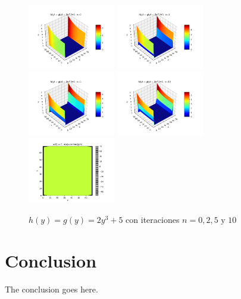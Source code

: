 \documentclass[10pt,journal,compsoc]{IEEEtran}
\begin{document}
\begin{figure}
  \centering
  \includegraphics[width=1.5in]{images/2y3-n0}
  \includegraphics[width=1.5in]{images/2y3-n2}
  \includegraphics[width=1.5in]{images/2y3-n5}
  \includegraphics[width=1.5in]{images/2y3-n10}
  \includegraphics[width=1.5in]{images/2y3-density}
  \caption{\(h(y) = g(y) = 2y^3+5\) con iteraciones \(n = 0, 2, 5 \text{ y } 10\)}
  \label{2y3-iterations}
\end{figure}










\section{Conclusion}
The conclusion goes here.
\end{document}
